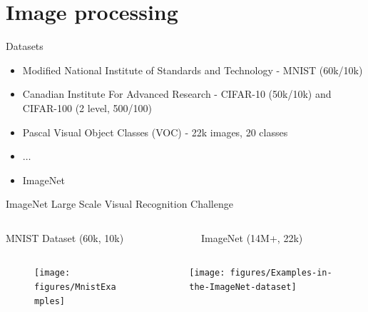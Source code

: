 \section{Image processing}

\begin{frame}{Datasets} 
	\begin{itemize}
		\item Modified National Institute of Standards and Technology - MNIST (60k/10k)
		\item Canadian Institute For Advanced Research -  CIFAR-10 (50k/10k) and CIFAR-100 (2 level, 500/100) 
		\item Pascal Visual Object Classes (VOC) - 22k images, 20 classes
		\item $\dots$ 
		\item ImageNet 
	\end{itemize}
\end{frame}

\begin{frame}{ImageNet Large Scale Visual Recognition Challenge}
	\begin{columns}
		\begin{column}{.5\textwidth}
			\begin{center}
				MNIST Dataset (60k, 10k)
			\end{center}
		\end{column}
		\begin{column}{.5\textwidth}
			\begin{center}
				ImageNet (14M+, 22k)
			\end{center}
		\end{column}
	\end{columns}
	\begin{columns}
		\begin{column}{.5\textwidth}
			\begin{figure}
				\texttt{[image: figures/MnistExamples]}
				\caption*{}
			\end{figure}
		\end{column}
		\begin{column}{.5\textwidth}
			\begin{figure}
			\texttt{[image: figures/Examples-in-the-ImageNet-dataset]}
			\caption*{}
		\end{figure}
		\end{column}
	\end{columns}
\end{frame}

